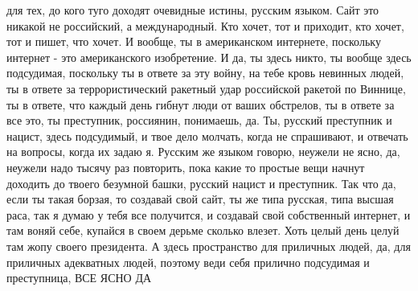  
 
 
 
 

для тех, до кого туго доходят очевидные истины, русским языком. Сайт это
никакой не российский, а международный. Кто хочет, тот и приходит, кто хочет,
тот и пишет, что хочет. И вообще, ты в американском интернете, поскольку
интернет - это американского изобретение. И да, ты здесь никто, ты вообще здесь
подсудимая, поскольку ты в ответе за эту войну, на тебе кровь невинных людей,
ты в ответе за террористический ракетный удар российской ракетой по Виннице, ты
в ответе, что каждый день гибнут люди от ваших обстрелов, ты в ответе за все
это, ты преступник, россиянин, понимаешь, да. Ты, русский преступник и нацист,
здесь подсудимый, и твое дело молчать, когда не спрашивают, и отвечать на
вопросы, когда их задаю я. Русским же языком говорю, неужели не ясно, да,
неужели надо тысячу раз повторить, пока какие то простые вещи начнут доходить
до твоего безумной башки, русский нацист и преступник. Так что да, если ты
такая борзая, то создавай свой сайт, ты же типа русская, типа высшая раса, так
я думаю у тебя все получится, и создавай свой собственный интернет, и там воняй
себе, купайся в своем дерьме сколько влезет. Хоть целый день целуй там жопу
своего президента.  А здесь пространство для приличных людей, да, для приличных
адекватных людей, поэтому веди себя прилично подсудимая и преступница, ВСЕ ЯСНО
ДА

